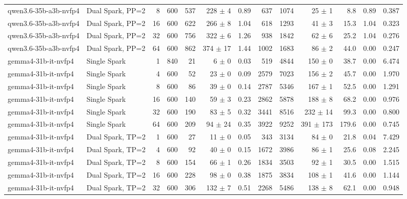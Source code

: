 \begin{tabular}{l l r r r r r r r r r r r}
qwen3.6-35b-a3b-nvfp4 & Dual Spark, PP=2 & 8 & 600 & 537 & 228 $\pm$ 4 & 0.89 & 637 & 1074 & 25 $\pm$ 1 & 8.8 & 0.89 & 0.387 \\
qwen3.6-35b-a3b-nvfp4 & Dual Spark, PP=2 & 16 & 600 & 622 & 266 $\pm$ 8 & 1.04 & 618 & 1293 & 41 $\pm$ 3 & 15.3 & 1.04 & 0.323 \\
qwen3.6-35b-a3b-nvfp4 & Dual Spark, PP=2 & 32 & 600 & 756 & 322 $\pm$ 6 & 1.26 & 938 & 1842 & 62 $\pm$ 6 & 25.2 & 1.04 & 0.276 \\
qwen3.6-35b-a3b-nvfp4 & Dual Spark, PP=2 & 64 & 600 & 862 & 374 $\pm$ 17 & 1.44 & 1002 & 1683 & 86 $\pm$ 2 & 44.0 & 0.00 & 0.247 \\
\addlinespace
gemma4-31b-it-nvfp4 & Single Spark & 1 & 840 & 21\rlap{$^\dagger$} & 6 $\pm$ 0 & 0.03 & 519 & 4844 & 150 $\pm$ 0 & 38.7 & 0.00 & 6.474 \\
gemma4-31b-it-nvfp4 & Single Spark & 4 & 600 & 52\rlap{$^\dagger$} & 23 $\pm$ 0 & 0.09 & 2579 & 7023 & 156 $\pm$ 2 & 45.7 & 0.00 & 1.970 \\
gemma4-31b-it-nvfp4 & Single Spark & 8 & 600 & 86\rlap{$^\dagger$} & 39 $\pm$ 0 & 0.14 & 2787 & 5346 & 167 $\pm$ 1 & 52.5 & 0.00 & 1.291 \\
gemma4-31b-it-nvfp4 & Single Spark & 16 & 600 & 140 & 59 $\pm$ 3 & 0.23 & 2862 & 5878 & 188 $\pm$ 8 & 68.2 & 0.00 & 0.976 \\
gemma4-31b-it-nvfp4 & Single Spark & 32 & 600 & 190 & 83 $\pm$ 5 & 0.32 & 3441 & 8516 & 232 $\pm$ 14 & 99.3 & 0.00 & 0.800 \\
gemma4-31b-it-nvfp4 & Single Spark & 64 & 600 & 209 & 94 $\pm$ 24 & 0.35 & 3922 & 9252 & 391 $\pm$ 173 & 179.6 & 0.00 & 0.745 \\
\addlinespace
gemma4-31b-it-nvfp4 & Dual Spark, TP=2 & 1 & 600 & 27\rlap{$^\dagger$} & 11 $\pm$ 0 & 0.05 & 343 & 3134 & 84 $\pm$ 0 & 21.8 & 0.04 & 7.429 \\
gemma4-31b-it-nvfp4 & Dual Spark, TP=2 & 4 & 600 & 92\rlap{$^\dagger$} & 40 $\pm$ 0 & 0.15 & 1672 & 3986 & 86 $\pm$ 1 & 25.6 & 0.08 & 2.245 \\
gemma4-31b-it-nvfp4 & Dual Spark, TP=2 & 8 & 600 & 154 & 66 $\pm$ 1 & 0.26 & 1834 & 3503 & 92 $\pm$ 1 & 30.5 & 0.00 & 1.515 \\
gemma4-31b-it-nvfp4 & Dual Spark, TP=2 & 16 & 600 & 228 & 98 $\pm$ 0 & 0.38 & 1875 & 3834 & 108 $\pm$ 1 & 41.6 & 0.00 & 1.144 \\
gemma4-31b-it-nvfp4 & Dual Spark, TP=2 & 32 & 600 & 306 & 132 $\pm$ 7 & 0.51 & 2268 & 5486 & 138 $\pm$ 8 & 62.1 & 0.00 & 0.948 \\

\end{tabular}
